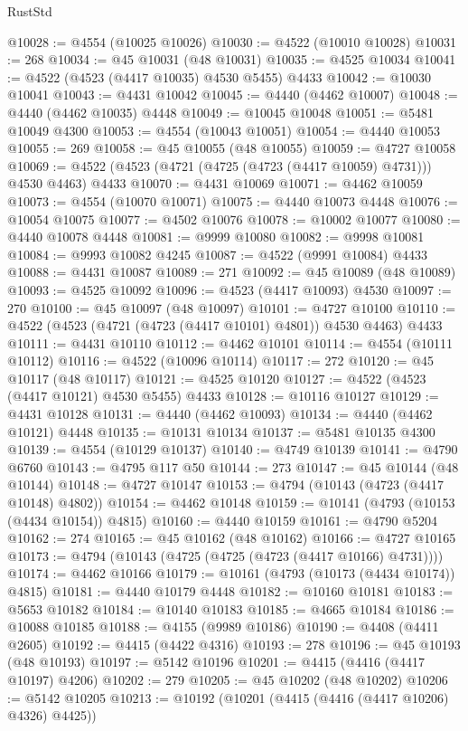 \begin{lexlean}{RustStd}
\begin{coremodule}
@10028 := @4554 (@10025 @10026)
@10030 := @4522 (@10010 @10028)
@10031 := 268
@10034 := @45 @10031 (@48 @10031)
@10035 := @4525 @10034
@10041 := @4522 (@4523 (@4417 @10035) @4530 @5455) @4433
@10042 := @10030 @10041
@10043 := @4431 @10042
@10045 := @4440 (@4462 @10007)
@10048 := @4440 (@4462 @10035) @4448
@10049 := @10045 @10048
@10051 := @5481 @10049 @4300
@10053 := @4554 (@10043 @10051)
@10054 := @4440 @10053
@10055 := 269
@10058 := @45 @10055 (@48 @10055)
@10059 := @4727 @10058
@10069 := @4522 (@4523 (@4721 (@4725 (@4723 (@4417 @10059) @4731))) @4530 @4463) @4433
@10070 := @4431 @10069
@10071 := @4462 @10059
@10073 := @4554 (@10070 @10071)
@10075 := @4440 @10073 @4448
@10076 := @10054 @10075
@10077 := @4502 @10076
@10078 := @10002 @10077
@10080 := @4440 @10078 @4448
@10081 := @9999 @10080
@10082 := @9998 @10081
@10084 := @9993 @10082 @4245
@10087 := @4522 (@9991 @10084) @4433
@10088 := @4431 @10087
@10089 := 271
@10092 := @45 @10089 (@48 @10089)
@10093 := @4525 @10092
@10096 := @4523 (@4417 @10093) @4530
@10097 := 270
@10100 := @45 @10097 (@48 @10097)
@10101 := @4727 @10100
@10110 := @4522 (@4523 (@4721 (@4723 (@4417 @10101) @4801)) @4530 @4463) @4433
@10111 := @4431 @10110
@10112 := @4462 @10101
@10114 := @4554 (@10111 @10112)
@10116 := @4522 (@10096 @10114)
@10117 := 272
@10120 := @45 @10117 (@48 @10117)
@10121 := @4525 @10120
@10127 := @4522 (@4523 (@4417 @10121) @4530 @5455) @4433
@10128 := @10116 @10127
@10129 := @4431 @10128
@10131 := @4440 (@4462 @10093)
@10134 := @4440 (@4462 @10121) @4448
@10135 := @10131 @10134
@10137 := @5481 @10135 @4300
@10139 := @4554 (@10129 @10137)
@10140 := @4749 @10139
@10141 := @4790 @6760
@10143 := @4795 @117 @50
@10144 := 273
@10147 := @45 @10144 (@48 @10144)
@10148 := @4727 @10147
@10153 := @4794 (@10143 (@4723 (@4417 @10148) @4802))
@10154 := @4462 @10148
@10159 := @10141 (@4793 (@10153 (@4434 @10154)) @4815)
@10160 := @4440 @10159
@10161 := @4790 @5204
@10162 := 274
@10165 := @45 @10162 (@48 @10162)
@10166 := @4727 @10165
@10173 := @4794 (@10143 (@4725 (@4725 (@4723 (@4417 @10166) @4731))))
@10174 := @4462 @10166
@10179 := @10161 (@4793 (@10173 (@4434 @10174)) @4815)
@10181 := @4440 @10179 @4448
@10182 := @10160 @10181
@10183 := @5653 @10182
@10184 := @10140 @10183
@10185 := @4665 @10184
@10186 := @10088 @10185
@10188 := @4155 (@9989 @10186)
@10190 := @4408 (@4411 @2605)
@10192 := @4415 (@4422 @4316)
@10193 := 278
@10196 := @45 @10193 (@48 @10193)
@10197 := @5142 @10196
@10201 := @4415 (@4416 (@4417 @10197) @4206)
@10202 := 279
@10205 := @45 @10202 (@48 @10202)
@10206 := @5142 @10205
@10213 := @10192 (@10201 (@4415 (@4416 (@4417 @10206) @4326) @4425))

\end{coremodule}
\end{lexlean}

